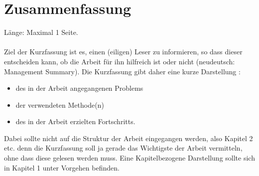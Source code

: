 \chapter*{Zusammenfassung}
Länge: Maximal 1 Seite.\\\\

\noindent Ziel der Kurzfassung ist es, einen (eiligen) Leser zu informieren, so dass dieser entscheiden kann, ob die Arbeit für ihn hilfreich ist oder nicht (neudeutsch: Management Summary). Die Kurzfassung gibt daher eine kurze Darstellung :
\begin{itemize}
	\item des in der Arbeit angegangenen Problems
	\item der verwendeten Methode(n)
	\item des in der Arbeit erzielten Fortschritts. 
\end{itemize}
Dabei sollte nicht auf die Struktur der Arbeit eingegangen werden, also Kapitel 2 etc. denn die Kurzfassung soll ja gerade das Wichtigste der Arbeit vermitteln, ohne dass diese gelesen werden muss. Eine Kapitelbezogene Darstellung sollte sich in Kapitel 1 unter Vorgehen befinden.

